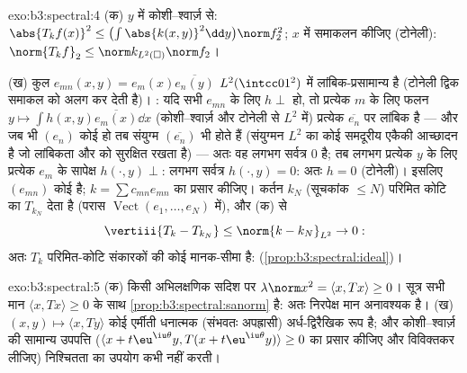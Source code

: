 \begin{solution}{exo:b3:spectral:4}
(क) $y$ में कोशी--श्वार्ज़ से: $\abs{T_kf(x)}^2 \leq
\bigl(\int\abs{k(x,y)}^2\dd y\bigr)\norm f_2^2$; $x$ में समाकलन कीजिए (टोनेली):
$\norm{T_kf}_2 \leq \norm k_{L^2(\square)}
\norm f_2$।

(ख) कुल $e_{mn}(x,y) = e_m(x)\overline{e_n(y)}$ $L^2(\intcc01^2)$ में लांबिक-प्रसामान्य है (टोनेली द्विक समाकल को
अलग कर देती है)। : यदि सभी $e_{mn}$ के लिए $h \perp$ हो, तो प्रत्येक
$m$ के लिए फलन $y \mapsto \int h(x,y)\overline{e_m(x)}\dd
x$ (कोशी--श्वार्ज़ और टोनेली से $L^2$ में) प्रत्येक
$\overline{e_n}$ पर लांबिक है --- और जब भी $(e_n)$ कोई  हो तब संयुग्म
$(\overline{e_n})$ भी होते हैं (संयुग्मन $L^2$ का कोई समदूरीय एकैकी आच्छादन है जो
लांबिकता और  को सुरक्षित रखता है) --- अतः वह लगभग सर्वत्र
$0$ है; तब लगभग प्रत्येक $y$ के लिए प्रत्येक $e_m$ के सापेक्ष $h(\cdot, y) \perp$:
लगभग सर्वत्र $h(\cdot, y) = 0$: अतः $h = 0$ (टोनेली)। इसलिए $(e_{mn})$ कोई 
है; $k = \sum c_{mn}e_{mn}$ का प्रसार कीजिए। कर्तन $k_N$ (सूचकांक $\leq N$) परिमित कोटि का
$T_{k_N}$ देता है (परास $\operatorname{Vect}(e_1, \dots,
e_N)$ में), और (क) से
\[
\vertiii{T_k - T_{k_N}} \leq \norm{k - k_N}_{L^2} \to 0 :
\]
अतः $T_k$ परिमित-कोटि संकारकों की कोई मानक-सीमा है:  (\cref{prop:b3:spectral:ideal})।
\end{solution}

\begin{solution}{exo:b3:spectral:5}
(क) किसी अभिलक्षणिक सदिश पर $\lambda\norm x^2 = \langle x, Tx\rangle \geq 0$। सूत्र सभी मान $\langle x,
Tx\rangle \geq 0$ के साथ \cref{prop:b3:spectral:sanorm}
है: अतः निरपेक्ष मान अनावश्यक है।
(ख) $(x, y) \mapsto \langle x, Ty\rangle$ कोई एर्मीती धनात्मक (संभवतः अपह्रासी) अर्ध-द्विरैखिक रूप
है; और कोशी--श्वार्ज़ की सामान्य उपपत्ति ($\langle x + t\eu^{\iu\theta}y,
T(x + t\eu^{\iu\theta}y)\rangle \geq 0$ का प्रसार कीजिए और
विविक्तकर लीजिए) निश्चितता का उपयोग कभी नहीं करती।
\end{solution}

